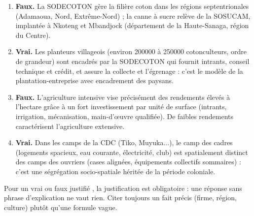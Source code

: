 \documentclass[11pt]{article}
\newcommand{\cle}[1]{{\popxbold\color{popdark}#1}}
\begin{document}
\begin{corrige}
\begin{enumerate}
\item \textbf{Faux.} La SODECOTON gère la filière \cle{coton} dans les régions septentrionales (Adamaoua, Nord, Extrême-Nord) ; la canne à sucre relève de la SOSUCAM, implantée à Nkoteng et Mbandjock (département de la Haute-Sanaga, région du Centre).
\item \textbf{Vrai.} Les planteurs villageois (environ \num{200000} à \num{250000} cotonculteurs, ordre de grandeur) sont encadrés par la SODECOTON qui fournit intrants, conseil technique et crédit, et assure la collecte et l'égrenage : c'est le modèle de la \cle{plantation-entreprise} avec encadrement des paysans.
\item \textbf{Faux.} L'\cle{agriculture intensive} vise précisément des rendements élevés à l'hectare grâce à un fort investissement par unité de surface (intrants, irrigation, mécanisation, main-d'œuvre qualifiée). De faibles rendements caractérisent l'agriculture extensive.
\item \textbf{Vrai.} Dans les camps de la CDC (Tiko, Muyuka...), le \og camp des cadres \fg{} (logements spacieux, eau courante, électricité, club) est spatialement distinct des \og camps des ouvriers \fg{} (cases alignées, équipements collectifs sommaires) : c'est une ségrégation socio-spatiale héritée de la période coloniale.
\end{enumerate}
\end{corrige}

\begin{attention}
Pour un \og vrai ou faux justifié \fg, la justification est obligatoire : une réponse sans phrase d'explication ne vaut rien. Citer toujours un fait précis (firme, région, culture) plutôt qu'une formule vague.
\end{attention}
\end{document}
